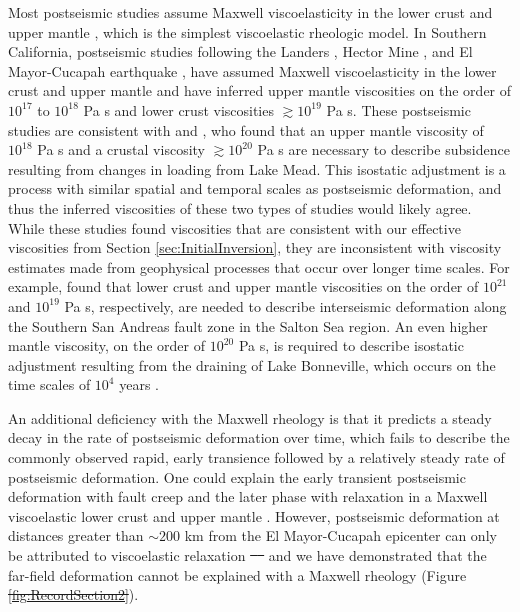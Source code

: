 \documentclass[draft,linenumbers]{AGUJournal}
\providecommand{\DIFadd}[1]{{\protect\color{blue}\uwave{#1}}} %
\providecommand{\DIFdel}[1]{{\protect\color{red}\sout{#1}}}                      %
\providecommand{\DIFaddbegin}{} %
\providecommand{\DIFaddend}{} %
\providecommand{\DIFdelbegin}{} %
\providecommand{\DIFdelend}{} %
\begin{document}
Most postseismic studies assume Maxwell viscoelasticity in the lower crust and upper mantle \citep[e.g.][]{Nur1974,Pollitz2000,Hetland2003,Freed2006a,Johnson2009,Hearn2009}, which is the simplest viscoelastic rheologic model.  In Southern California, postseismic studies following the Landers \citep{Pollitz2000}, Hector Mine \citep{Pollitz2001}, and El Mayor-Cucapah earthquake \citep{Spinler2015,Rollins2015}, have assumed Maxwell viscoelasticity in the lower crust and upper mantle and have inferred upper mantle viscosities on the order of $10^{17}$ to $10^{18}$ Pa s and lower crust viscosities $\gtrsim 10^{19}$ Pa s.  These postseismic studies are consistent with \citet{Kaufmann2000} and \citet{Cavalie2007}, who found that an upper mantle viscosity of $10^{18}$ Pa s and a crustal viscosity $\gtrsim10^{20}$ Pa s are necessary to describe subsidence resulting from changes in loading from Lake Mead. This isostatic adjustment is a process with similar spatial and temporal scales as postseismic deformation, and thus the inferred viscosities of these two types of studies would likely agree. While these studies found viscosities that are consistent with our effective viscosities from Section \ref{sec:InitialInversion}, they are inconsistent with viscosity estimates made from geophysical processes that occur over longer time scales. For example, \citet{Lundgren2009} found that lower crust and upper mantle viscosities on the order of $10^{21}$ and $10^{19}$ Pa s, respectively, are needed to describe interseismic deformation along the Southern San Andreas fault zone in the Salton Sea region.  An even higher mantle viscosity, on the order of $10^{20}$ Pa s, is required to describe isostatic adjustment resulting from the draining of Lake Bonneville, which occurs on the time scales of $10^{4}$ years \citep{Crittenden1967,Bills1987}.  

An additional deficiency with the Maxwell rheology is that it predicts a steady decay in the rate of postseismic deformation over time, which fails to describe the commonly observed rapid, early transience followed by a relatively steady rate of postseismic deformation.  One could explain the early transient postseismic deformation with fault creep and the later phase with relaxation in a Maxwell viscoelastic lower crust and upper mantle \citep[e.g][]{Hearn2009,Johnson2009}. However, postseismic deformation at distances greater than ${\sim}200$ km from the El Mayor-Cucapah epicenter can only be attributed to viscoelastic relaxation \DIFdelbegin \DIFdel{\mbox{%
\citep{Freed2007a}
}%
}\DIFdelend \DIFaddbegin \DIFadd{\mbox{%
\citep[e.g.][]{Freed2007a}
}%
}\DIFaddend and we have demonstrated that the far-field deformation cannot be explained with a Maxwell rheology (Figure \DIFdelbegin \DIFdel{\ref{fig:RecordSection2}}\DIFdelend \DIFaddbegin \DIFadd{\ref{fig:RecordSectionMain}}\DIFaddend ).
\end{document}
